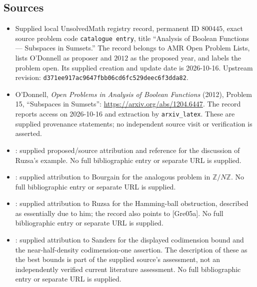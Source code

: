 \documentclass[11pt]{article}
\newcommand{\Z}{\mathbb{Z}}
\begin{document}
\subsection{Sources}
\begin{itemize}
\item Supplied local UnsolvedMath registry record, permanent ID \(800445\), exact source problem code \texttt{catalogue entry}, title ``Analysis of Boolean Functions --- Subspaces in Sumsets.'' The record belongs to AMR Open Problem Lists, lists O'Donnell as proposer and \(2012\) as the proposed year, and labels the problem open. Its supplied creation and update date is 2026-10-16. Upstream revision: \texttt{d371ee917ac9647fbb06cd6fc529deec6f3dda82}.
\item O'Donnell, \emph{Open Problems in Analysis of Boolean Functions} (2012), Problem 15, ``Subspaces in Sumsets'': \url{https://arxiv.org/abs/1204.6447}. The record reports access on 2026-10-16 and extraction by \texttt{arxiv\_latex}. These are supplied provenance statements; no independent source visit or verification is asserted.
\item [Gre05a]: supplied proposed/source attribution and reference for the discussion of Ruzsa's example. No full bibliographic entry or separate URL is supplied.
\item [Bou90]: supplied attribution to Bourgain for the analogous problem in \(\Z/N\Z\). No full bibliographic entry or separate URL is supplied.
\item [Ruz93]: supplied attribution to Ruzsa for the Hamming-ball obstruction, described as essentially due to him; the record also points to [Gre05a]. No full bibliographic entry or separate URL is supplied.
\item [San10a]: supplied attribution to Sanders for the displayed codimension bound and the near-half-density codimension-one assertion. The description of these as the best bounds is part of the supplied source's assessment, not an independently verified current literature assessment. No full bibliographic entry or separate URL is supplied.
\end{itemize}
\end{document}
